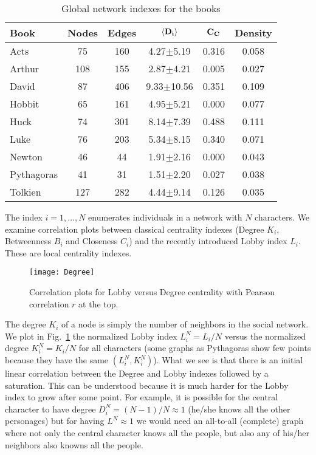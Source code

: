 \documentclass[review]{elsarticle}
\begin{document}
\begin{table}[ht]
\centering\small
{\small\begin{tabular}{l|c|c|c|c|c}\hline
\bf\hfil Book\hfil  & \bf\hfil Nodes\hfil  & \bf\hfil 
Edges\hfil  & ${\bf \left \langle 
D_i \right \rangle}$ \hfil \hfil  & \hfil 
${\bf C_C}$\hfil  & \bf\hfil Density \hfil \\ \hline
Acts & 75 & 160 & 4.27$\pm$5.19 & 0.316 & 0.058 \\ 
Arthur & 108 & 155 & 2.87$\pm$4.21 & 0.005 & 0.027 \\ 
David & 87 & 406 & 9.33$\pm$10.56 & 0.351 & 0.109 \\ 
Hobbit & 65 & 161 & 4.95$\pm$5.21 & 0.000 & 0.077 \\ 
Huck & 74 & 301 & 8.14$\pm$7.39 & 0.488 & 0.111 \\ 
Luke & 76 & 203 & 5.34$\pm$8.15 & 0.340 & 0.071 \\ 
Newton & 46 & 44 & 1.91$\pm$2.16 & 0.000 & 0.043 \\ 
Pythagoras & 41 & 31 & 1.51$\pm$2.20 & 0.027 & 0.038\\ 
Tolkien & 127 & 282 & 4.44$\pm$9.14 & 0.126 & 0.035\\ 
\hline\end{tabular}}
\caption{Global network indexes for the books} 
\label{tab:global}
\end{table}

The index $i = 1, \ldots , N$ enumerates individuals in a
network with $N$ characters.
We examine correlation plots between classical centrality indexes
(Degree $K_i$, Betweenness $B_i$ and Closeness $C_i$)
and the recently introduced Lobby index $L_i$. These are local
centrality indexes.

\begin{figure}[ht]
\centering
\texttt{[image: Degree]}
\caption{\label{FigD} Correlation plots 
for Lobby versus Degree centrality 
with Pearson correlation $r$ at the top.}
\end{figure}

The degree  $K_i$ of a node  is simply the 
number of neighbors in the
social network. We plot in Fig.~\ref{FigD} the normalized 
Lobby index $L^N_i = L_i/N$ versus the normalized 
degree $K^N_i = K_i/N$ for all characters (some graphs as Pythagoras 
show few points because they have the same $(L^N_i,K^N_i)$).
What we see is that there is an initial linear
correlation between the Degree and Lobby indexes followed by
a saturation. This can be understood because it is much harder
for the Lobby index to grow after some point. For example,
it is possible for the central character 
to have degree $D^N_i=(N-1)/N \approx 1$
(he/she knows all the other personages) but for having
$L^N \approx 1$ we would need an all-to-all (complete) graph
where not only the central character knows all the people,
but also any of his/her neighbors also knowns all the people.
\end{document}
